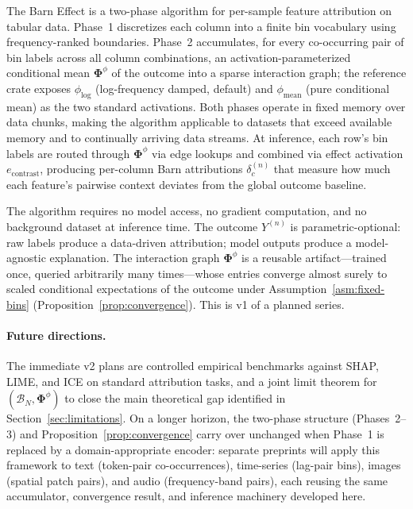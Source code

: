 \documentclass[11pt]{article}
\begin{document}
The Barn Effect is a two-phase algorithm for per-sample feature attribution on tabular data.
Phase~1 discretizes each column into a finite bin vocabulary using frequency-ranked boundaries.
Phase~2 accumulates, for every co-occurring pair of bin labels across all column combinations, an activation-parameterized conditional mean $\bm{\Phi}^\phi$ of the outcome into a sparse interaction graph; the reference crate exposes $\phi_{\log}$ (log-frequency damped, default) and $\phi_{\mathrm{mean}}$ (pure conditional mean) as the two standard activations.
Both phases operate in fixed memory over data chunks, making the algorithm applicable to datasets that exceed available memory and to continually arriving data streams.
At inference, each row's bin labels are routed through $\bm{\Phi}^\phi$ via edge lookups and combined via effect activation $e_{\mathrm{contrast}}$, producing per-column Barn attributions $\delta_c^{(n)}$ that measure how much each feature's pairwise context deviates from the global outcome baseline.

The algorithm requires no model access, no gradient computation, and no background dataset at inference time.
The outcome $Y^{(n)}$ is parametric-optional: raw labels produce a data-driven attribution; model outputs produce a model-agnostic explanation.
The interaction graph $\bm{\Phi}^\phi$ is a reusable artifact---trained once, queried arbitrarily many times---whose entries converge almost surely to scaled conditional expectations of the outcome under Assumption~\ref{asm:fixed-bins} (Proposition~\ref{prop:convergence}).
This is v1 of a planned series.

\paragraph{Future directions.}
The immediate v2 plans are controlled empirical benchmarks against SHAP, LIME, and ICE on standard attribution tasks, and a joint limit theorem for $(\mathcal{B}_N, \bm{\Phi}^\phi)$ to close the main theoretical gap identified in Section~\ref{sec:limitations}.
On a longer horizon, the two-phase structure (Phases~2--3) and Proposition~\ref{prop:convergence} carry over unchanged when Phase~1 is replaced by a domain-appropriate encoder: separate preprints will apply this framework to text (token-pair co-occurrences), time-series (lag-pair bins), images (spatial patch pairs), and audio (frequency-band pairs), each reusing the same accumulator, convergence result, and inference machinery developed here.
\end{document}
